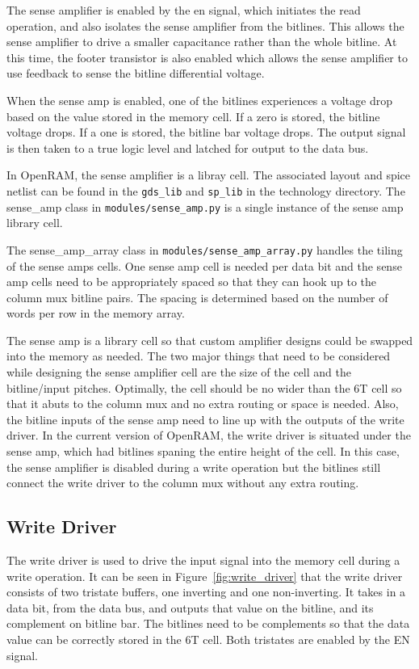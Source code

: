 The sense amplifier is enabled by the en signal, which initiates the
read operation, and also isolates the sense amplifier from the
bitlines.  This allows the sense amplifier to drive a smaller
capacitance rather than the whole bitline.  At this time, the footer
transistor is also enabled which allows the sense amplifier to use
feedback to sense the bitline differential voltage.

When the sense amp is enabled, one of the bitlines experiences a
voltage drop based on the value stored in the memory cell.  If a zero
is stored, the bitline voltage drops.  If a one is stored, the bitline
bar voltage drops.  The output signal is then
taken to a true logic level and latched for output to the data bus.

In OpenRAM, the sense amplifier is a libray cell.  The associated
layout and spice netlist can be found in the \verb|gds_lib| and
\verb|sp_lib| in the technology directory. The sense\_amp class in
\verb|modules/sense_amp.py| is a single instance of the sense amp
library cell.


The sense\_amp\_array class in \verb|modules/sense_amp_array.py|
handles the tiling of the sense amps cells.  One sense amp cell is
needed per data bit and the sense amp cells need to be appropriately
spaced so that they can hook up to the column mux bitline pairs.  The
spacing is determined based on the number of words per row in the
memory array.  

The sense amp is a library cell so that custom
amplifier designs could be swapped into the memory as needed.  The two
major things that need to be considered while designing the sense
amplifier cell are the size of the cell and the bitline/input pitches.
Optimally, the cell should be no wider than the 6T cell so that it
abuts to the column mux and no extra routing or space is needed.
Also, the bitline inputs of the sense amp need to line up with the
outputs of the write driver.  In the current version of OpenRAM, the
write driver is situated under the sense amp, which had bitlines
spaning the entire height of the cell.  In this case, the sense
amplifier is disabled during a write operation but the bitlines still
connect the write driver to the column mux without any extra routing.


\subsection{Write Driver}
\label{sec:writedriver}

The write driver is used to drive the input signal into the memory
cell during a write operation.  It can be seen in
Figure~\ref{fig:write_driver} that the write driver consists of two
tristate buffers, one inverting and one non-inverting.  It takes in a
data bit, from the data bus, and outputs that value on the bitline,
and its complement on bitline bar.  The bitlines need to be
complements so that the data value can be correctly stored in the 6T
cell. Both tristates are enabled by the EN signal.

